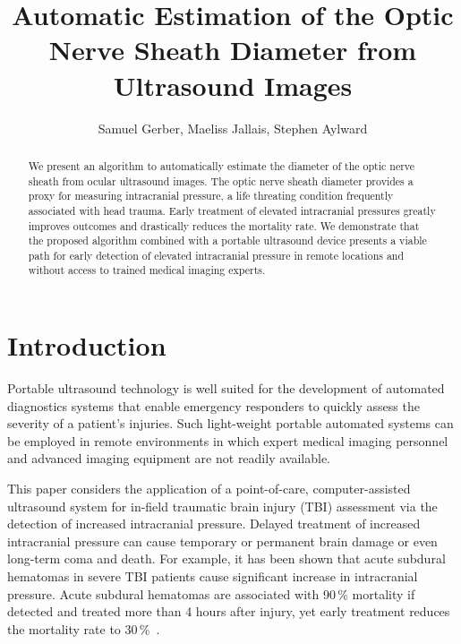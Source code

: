 \documentclass{llncs}
\begin{document}
\title{Automatic Estimation of the Optic Nerve Sheath Diameter from Ultrasound Images}
%
%
\author{
Samuel Gerber,
Maeliss Jallais,
Stephen Aylward
}

%
%
%

\maketitle              %

\begin{abstract}
We present an algorithm to automatically estimate the diameter of the optic
nerve sheath from ocular ultrasound images. The optic nerve sheath diameter
provides a proxy for measuring intracranial pressure,  a life threating
condition frequently associated with head trauma. Early treatment of elevated
intracranial pressures greatly improves outcomes and drastically reduces the
mortality rate. We demonstrate that the proposed algorithm combined with a
portable ultrasound device presents a viable path for early detection of
elevated intracranial pressure in remote locations and without access to
trained medical imaging experts. 
\end{abstract}
%
\section{Introduction}
Portable ultrasound technology is well suited for the development of automated
diagnostics systems that enable emergency responders to quickly assess the
severity of a patient's injuries. Such light-weight portable automated systems
can be employed in remote environments in which expert medical imaging
personnel and advanced imaging equipment are not readily available.
 
This paper considers the application of a point-of-care, computer-assisted
ultrasound system for in-field traumatic brain injury (TBI) assessment via the
detection of increased intracranial pressure. Delayed treatment of increased
intracranial pressure can cause temporary or permanent brain damage or even
long-term coma and death. For example, it has been shown that acute subdural
hematomas in severe TBI patients cause significant increase in intracranial
pressure. Acute subdural hematomas are associated with 90\,\% mortality if
detected and treated more than 4 hours after injury, yet early treatment
reduces the mortality rate to 30\,\%~\cite{Se1981}.
\end{document}
